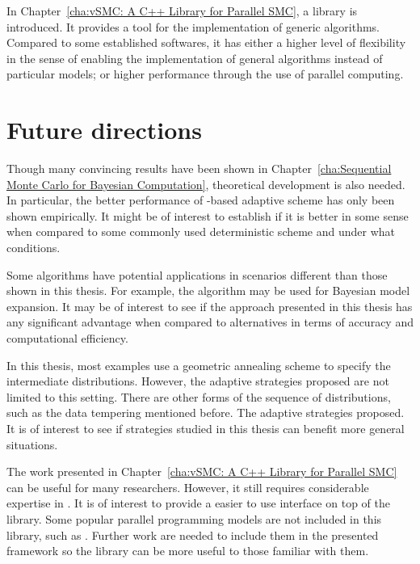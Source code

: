In Chapter~\ref{cha:vSMC: A C++ Library for Parallel SMC}, a \cpp library is
introduced. It provides a tool for the implementation of generic \smc
algorithms. Compared to some established softwares, it has either a higher
level of flexibility in the sense of enabling the implementation of general
algorithms instead of particular models; or higher performance through the use
of parallel computing.

\section{Future directions}
\label{sec:Further directions}

Though many convincing results have been shown in Chapter~\ref{cha:Sequential
  Monte Carlo for Bayesian Computation}, theoretical development is also
needed. In particular, the better performance of \cess-based adaptive scheme
has only been shown empirically. It might be of interest to establish if it is
better in some sense when compared to some commonly used deterministic
scheme and under what conditions.

Some algorithms have potential applications in scenarios different than those
shown in this thesis. For example, the \smc[3] algorithm may be used for
Bayesian model expansion. It may be of interest to see if the approach
presented in this thesis has any significant advantage when compared to
alternatives in terms of accuracy and computational efficiency.

In this thesis, most examples use a geometric annealing scheme to specify the
intermediate distributions. However, the adaptive strategies proposed are not
limited to this setting. There are other forms of the sequence of
distributions, such as the data tempering mentioned before. The adaptive
strategies proposed. It is of interest to see if strategies studied in this
thesis can benefit more general situations.

The work presented in Chapter~\ref{cha:vSMC: A C++ Library for Parallel SMC}
can be useful for many researchers. However, it still requires considerable
expertise in \cpp. It is of interest to provide a easier to use interface on
top of the library. Some popular parallel programming models are not included
in this library, such as \cuda \cite{cuda}. Further work are needed to include
them in the presented framework so the library can be more useful to those
familiar with them.
